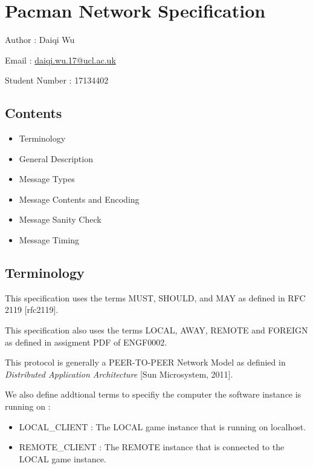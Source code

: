\documentclass[]{article}
\date{}
\providecommand{\tightlist}{%
  \setlength{\itemsep}{0pt}\setlength{\parskip}{0pt}}
\begin{document}
\hypertarget{pacman-network-specification}{%
\section{Pacman Network
Specification}\label{pacman-network-specification}}

Author : Daiqi Wu

Email : \url{daiqi.wu.17@ucl.ac.uk}

Student Number : 17134402

\hypertarget{contents}{%
\subsection{Contents}\label{contents}}

\begin{itemize}
\tightlist
\item
  Terminology
\item
  General Description
\item
  Message Types
\item
  Message Contents and Encoding
\item
  Message Sanity Check
\item
  Message Timing
\end{itemize}

\hypertarget{terminology}{%
\subsection{Terminology}\label{terminology}}

This specification uses the terms MUST, SHOULD, and MAY as defined in
RFC 2119 {[}rfc2119{]}.

This specification also uses the terms LOCAL, AWAY, REMOTE and FOREIGN
as defined in assigment PDF of ENGF0002.

This protocol is generally a PEER-TO-PEER Network Model as definied in
\emph{Distributed Application Architecture} {[}Sun Microsystem, 2011{]}.

We also define addtional terms to specifiy the computer the software
instance is running on :

\begin{itemize}
\item
  LOCAL\_CLIENT : The LOCAL game instance that is running on localhost.
\item
  REMOTE\_CLIENT : The REMOTE instance that is connected to the LOCAL
  game instance.
\end{itemize}
\end{document}
